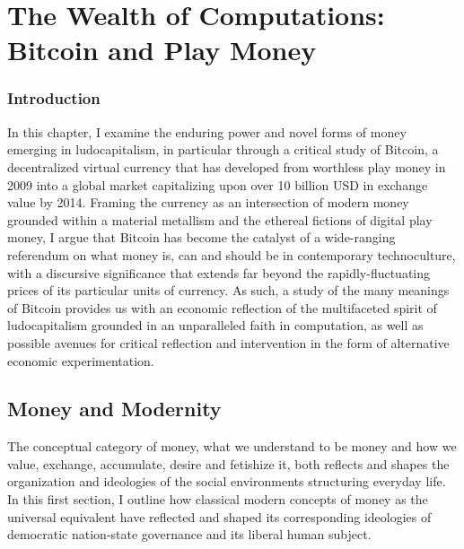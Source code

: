 \chapter{The Wealth of Computations: Bitcoin and Play Money}
\label{bitcoin}
\subsection*{Introduction}
In this chapter, I examine the enduring power and novel forms of money emerging in ludocapitalism, in particular through a critical study of Bitcoin, a decentralized virtual currency that has developed from worthless play money in 2009 into a global market capitalizing upon over 10 billion USD in exchange value by 2014. Framing the currency as an intersection of modern money grounded within a material metallism and the ethereal fictions of digital play money, I argue that Bitcoin has become the catalyst of a wide-ranging referendum on what money is, can and should be in contemporary technoculture, with a discursive significance that extends far beyond the rapidly-fluctuating prices of its particular units of currency. As such, a study of the many meanings of Bitcoin provides us with an economic reflection of the multifaceted spirit of ludocapitalism grounded in an unparalleled faith in computation, as well as possible avenues for critical reflection and intervention in the form of alternative economic experimentation.

\section{Money and Modernity}
The conceptual category of money, what we understand to be money and how we value, exchange, accumulate, desire and fetishize it, both reflects and shapes the organization and ideologies of the social environments structuring everyday life. In this first section, I outline how classical modern concepts of money as the universal equivalent have reflected and shaped its corresponding ideologies of democratic nation-state governance and its liberal human subject.

